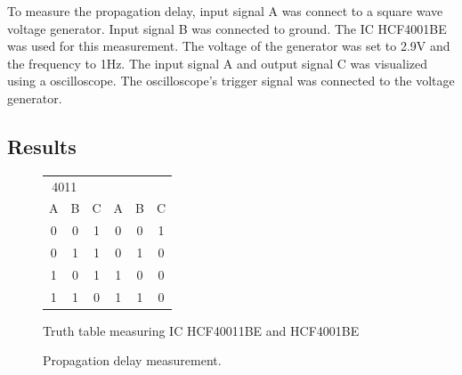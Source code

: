 \documentclass[journal]{IEEEtran}
\begin{document}
To measure the propagation delay, input signal A was connect to a square wave
voltage generator. Input signal B was connected to ground. The IC HCF4001BE
was used for this measurement. The voltage of the generator was set to 2.9V and
the frequency to 1Hz. The input signal A and output signal C was visualized
using a oscilloscope. The oscilloscope's trigger signal was connected to the voltage
generator.

\subsection{Results}

\begin{figure}
\centering
\begin{tabular}{c c | c || c c | c}
  \multicolumn{2}{c}{4011}
  \multicolumn{5}{c}{4001} \\
  A & B & C & A & B & C \\ \hline
  0 & 0 & 1 & 0 & 0 & 1 \\
  0 & 1 & 1 & 0 & 1 & 0 \\
  1 & 0 & 1 & 1 & 0 & 0 \\
  1 & 1 & 0 & 1 & 1 & 0 \\
  
\end{tabular}
\caption{Truth table measuring IC HCF40011BE and HCF4001BE}
\label{tab:truthtable} 
\end{figure}

 \begin{figure}
  \caption{Propagation delay measurement.}
  \label{fig:propdelay}
\end{figure}
\end{document}
